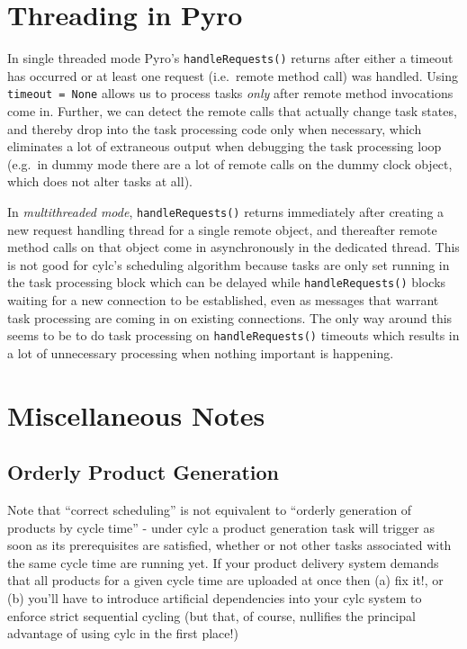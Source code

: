 \documentclass[11pt,a4paper]{article}
\begin{document}
\pagebreak
\section{Threading in Pyro} \label{pyro-appendix}

In single threaded mode Pyro's \verb#handleRequests()# returns
after either a timeout has occurred or at least one request
(i.e.\ remote method call) was handled. Using \verb#timeout = None# 
allows us to process tasks {\em only} after remote method invocations
come in.  Further, we can detect the remote calls that actually change
task states, and thereby drop into the task processing code only when
necessary, which eliminates a lot of extraneous output when debugging
the task processing loop (e.g.\ in dummy mode there are a lot of remote
calls on the dummy clock object, which does not alter tasks at all). 

In {\em multithreaded mode}, \verb#handleRequests()# returns immediately
after creating a new request handling thread for a single remote object,
and thereafter remote method calls on that object come in asynchronously
in the dedicated thread. This is not good for cylc's scheduling
algorithm because tasks are only set running in the task processing
block which can be delayed while \verb#handleRequests()# blocks waiting
for a new connection to be established, even as messages that warrant
task processing are coming in on existing connections. The only way
around this seems to be to do task processing on \verb#handleRequests()#
timeouts which results in a lot of unnecessary processing when nothing
important is happening.


\pagebreak
\section{Miscellaneous Notes}

\subsection{Orderly Product Generation}

Note that ``correct scheduling'' is not equivalent to ``orderly
generation of products by cycle time'' - under cylc a product
generation task will trigger as soon as its prerequisites are satisfied,
whether or not other tasks associated with the same cycle time are
running yet.  If your product delivery system demands that all products
for a given cycle time are uploaded at once then (a) fix it!, or (b)
you'll have to introduce artificial dependencies into your cylc system
to enforce strict sequential cycling (but that, of course, nullifies the
principal advantage of using cylc in the first place!)
\end{document}
